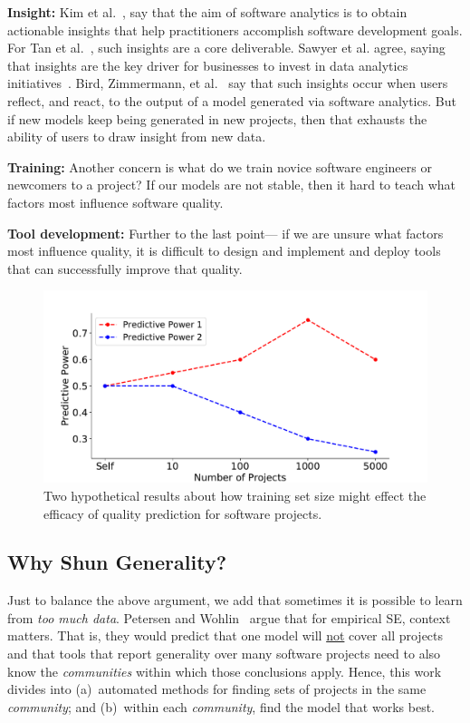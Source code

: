 \documentclass[10pt,journal,compsoc]{IEEEtran}
\begin{document}
\textbf{Insight:} Kim et al.~\cite{Kim2016}, say  that the aim of software analytics is to obtain actionable insights that help practitioners accomplish software development goals. For Tan et al.~\cite{tan2016defining}, such   insights  are a core deliverable. Sawyer et al. agree, saying that  insights are the key driver for businesses to invest in data analytics initiatives~\cite{sawyer2013bi}. Bird, Zimmermann, et al.~\cite{Bird:2015} say that such  insights occur when users reflect, and react, to the output of a model generated via software analytics. But if  new models keep being generated in new projects, then that exhausts the ability of  users to draw insight from  new data.

\textbf{Training:} Another concern is what do we train novice software engineers or newcomers to a project? If our models are not stable, then it hard to teach what factors  most influence software quality.

\textbf{Tool development:} Further to the last point--- if we are unsure what factors most influence quality, it is difficult to design and implement and deploy tools that can successfully improve that quality.


\begin{figure}[!t]
    \centering
    \includegraphics[width=\linewidth]{figs/predictive_power.pdf}
    \caption{Two hypothetical results about how training set size might effect the efficacy of quality prediction for software projects.}
    \label{fig:predictive_power}
\end{figure}



\subsection{Why Shun Generality?}
Just to balance the above argument,
we add that   sometimes it is possible to learn from {\em too much data}.
Petersen and Wohlin~\cite{Petersen2009} argue that for empirical SE, context matters. That is, they would predict that one model  will \underline{not}  cover all  projects and that tools that report  generality  over many software projects need to also know the {\em communities} within which those conclusions   apply. Hence, this work divides into (a)~automated methods for finding sets of projects in the same {\em community}; and (b)~within each {\em community}, find the model that works best. 
\end{document}
